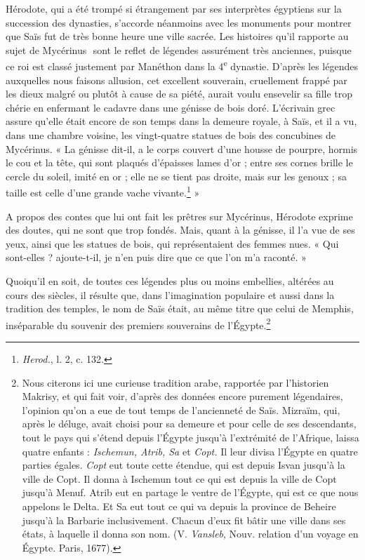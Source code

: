 \documentclass[a4paper, 11pt, oneside]{article}
\newcommand*\hieroAAGU{}
\begin{document}
Hérodote, qui a été trompé si étrangement par ses interprètes égyptiens sur la succession des dynasties, s'accorde néanmoins avec les monuments pour montrer que Saïs fut de très bonne heure une ville sacrée. Les histoires qu'il rapporte au sujet de Mycérinus $\hieroAAGU$ sont le reflet de légendes assurément très anciennes, puisque ce roi est classé justement par Manéthon dans la 4\textsuperscript{e} dynastie. D'après les légendes auxquelles nous faisons allusion, cet excellent souverain, cruellement frappé par les dieux malgré ou plutôt à cause de sa piété, aurait voulu ensevelir sa fille trop chérie en enfermant le cadavre dans une génisse de bois doré. L'écrivain grec assure qu'elle était encore de son temps dans la demeure royale, à Saïs, et il a vu, dans une chambre voisine, les vingt-quatre statues de bois des concubines de Mycérinus. « La génisse dit-il, a le corps couvert d'une housse de pourpre, hormis le cou et la tête, qui sont plaqués d'épaisses lames d'or ; entre ses cornes brille le cercle du soleil, imité en or ; elle ne se tient pas droite, mais sur les genoux ; sa taille est celle d'une grande vache vivante.\footnote{\emph{Herod.}, l. 2, c. 132.} »

A propos des contes que lui ont fait les prêtres sur Mycérinus, Hérodote exprime des doutes, qui ne sont que trop fondés. Mais, quant à la génisse, il l'a vue de ses yeux, ainsi que les statues de bois, qui représentaient des femmes nues. « Qui sont-elles ? ajoute-t-il, je n'en puis dire que ce que l'on m'a raconté. »

Quoiqu'il en soit, de toutes ces légendes plus ou moins embellies, altérées au cours des siècles, il résulte que, dans l'imagination populaire et aussi dans la tradition des temples, le nom de Saïs était, au même titre que celui de Memphis, inséparable du souvenir des premiers souverains de l'Égypte.\footnote{Nous citerons ici une curieuse tradition arabe, rapportée par l'historien Makrisy, et qui fait voir, d'après des données encore purement légendaires, l'opinion qu'on a eue de tout temps de l'ancienneté de Saïs. Mizraïm, qui, après le déluge, avait choisi pour sa demeure et pour celle de ses descendants, tout le pays qui s'étend depuis l'Égypte jusqu'à l'extrémité de l'Afrique, laissa quatre enfants : \emph{Ischemun, Atrib, Sa} et \emph{Copt.} Il leur divisa l'Égypte en quatre parties égales. \emph{Copt} eut toute cette étendue, qui est depuis Isvan jusqu'à la ville de Copt. Il donna à Ischemun tout ce qui est depuis la ville de Copt jusqu'à Menuf. Atrib eut en partage le ventre de l'Égypte, qui est ce que nous appelons le Delta. Et Sa eut tout ce qui va depuis la province de Beheire jusqu'à la Barbarie inclusivement. Chacun d'eux fit bâtir une ville dans ses états, à laquelle il donna son nom. (V. \emph{Vansleb}, Nouv. relation d'un voyage en Égypte. Paris, 1677).}
\end{document}
